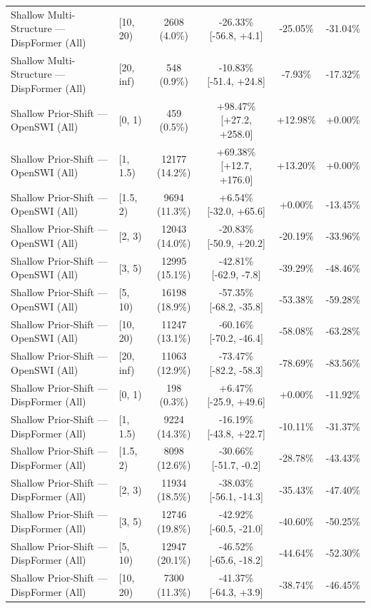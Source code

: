 \begin{table}[t]
\begin{tabular}{llcccc}
Shallow Multi-Structure — DispFormer (All) & [10, 20) & 2608 (4.0\%) & -26.33\% [-56.8, +4.1] & -25.05\% & -31.04\% \\
Shallow Multi-Structure — DispFormer (All) & [20, inf) & 548 (0.9\%) & -10.83\% [-51.4, +24.8] & -7.93\% & -17.32\% \\
Shallow Prior-Shift — OpenSWI (All) & [0, 1) & 459 (0.5\%) & +98.47\% [+27.2, +258.0] & +12.98\% & +0.00\% \\
Shallow Prior-Shift — OpenSWI (All) & [1, 1.5) & 12177 (14.2\%) & +69.38\% [+12.7, +176.0] & +13.20\% & +0.00\% \\
Shallow Prior-Shift — OpenSWI (All) & [1.5, 2) & 9694 (11.3\%) & +6.54\% [-32.0, +65.6] & +0.00\% & -13.45\% \\
Shallow Prior-Shift — OpenSWI (All) & [2, 3) & 12043 (14.0\%) & -20.83\% [-50.9, +20.2] & -20.19\% & -33.96\% \\
Shallow Prior-Shift — OpenSWI (All) & [3, 5) & 12995 (15.1\%) & -42.81\% [-62.9, -7.8] & -39.29\% & -48.46\% \\
Shallow Prior-Shift — OpenSWI (All) & [5, 10) & 16198 (18.9\%) & -57.35\% [-68.2, -35.8] & -53.38\% & -59.28\% \\
Shallow Prior-Shift — OpenSWI (All) & [10, 20) & 11247 (13.1\%) & -60.16\% [-70.2, -46.4] & -58.08\% & -63.28\% \\
Shallow Prior-Shift — OpenSWI (All) & [20, inf) & 11063 (12.9\%) & -73.47\% [-82.2, -58.3] & -78.69\% & -83.56\% \\
Shallow Prior-Shift — DispFormer (All) & [0, 1) & 198 (0.3\%) & +6.47\% [-25.9, +49.6] & +0.00\% & -11.92\% \\
Shallow Prior-Shift — DispFormer (All) & [1, 1.5) & 9224 (14.3\%) & -16.19\% [-43.8, +22.7] & -10.11\% & -31.37\% \\
Shallow Prior-Shift — DispFormer (All) & [1.5, 2) & 8098 (12.6\%) & -30.66\% [-51.7, -0.2] & -28.78\% & -43.43\% \\
Shallow Prior-Shift — DispFormer (All) & [2, 3) & 11934 (18.5\%) & -38.03\% [-56.1, -14.3] & -35.43\% & -47.40\% \\
Shallow Prior-Shift — DispFormer (All) & [3, 5) & 12746 (19.8\%) & -42.92\% [-60.5, -21.0] & -40.60\% & -50.25\% \\
Shallow Prior-Shift — DispFormer (All) & [5, 10) & 12947 (20.1\%) & -46.52\% [-65.6, -18.2] & -44.64\% & -52.30\% \\
Shallow Prior-Shift — DispFormer (All) & [10, 20) & 7300 (11.3\%) & -41.37\% [-64.3, +3.9] & -38.74\% & -46.45\% \\

\end{tabular}
\end{table}
